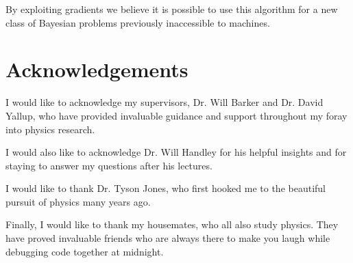 \documentclass[11pt]{article}
\begin{document}
    By exploiting gradients we believe it is possible to use this algorithm for a new class of
    Bayesian problems previously inaccessible to machines.

\section*{Acknowledgements}
    I would like to acknowledge my supervisors, Dr. Will Barker and Dr. David Yallup, who have provided invaluable
    guidance and support throughout my foray into physics research.

    I would also like to acknowledge Dr. Will Handley for his helpful insights
    and for staying to answer my questions after his lectures.

    I would like to thank Dr. Tyson Jones, who first hooked me to the beautiful pursuit of physics many years ago.

    Finally, I would like to thank my housemates, who all also study physics.
    They have proved invaluable friends who are always there to make you laugh while debugging code together at midnight.
\end{document}
